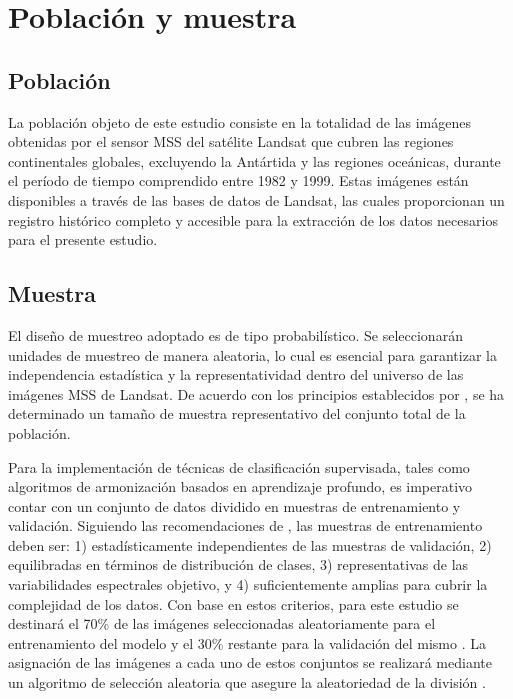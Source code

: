     \section{Población y muestra}
    
        \subsection{Población}
            La población objeto de este estudio consiste en la totalidad de las imágenes obtenidas por el sensor MSS del satélite Landsat que cubren las regiones continentales globales, excluyendo la Antártida y las regiones oceánicas, durante el período de tiempo comprendido entre 1982 y 1999. Estas imágenes están disponibles a través de las bases de datos de Landsat, las cuales proporcionan un registro histórico completo y accesible para la extracción de los datos necesarios para el presente estudio.

        \subsection{Muestra}
            El diseño de muestreo adoptado es de tipo probabilístico. Se seleccionarán unidades de muestreo de manera aleatoria, lo cual es esencial para garantizar la independencia estadística y la representatividad dentro del universo de las imágenes MSS de Landsat. De acuerdo con los principios establecidos por \textcite{hernandez2014recoleccion}, se ha determinado un tamaño de muestra representativo del conjunto total de la población.

            Para la implementación de técnicas de clasificación supervisada, tales como algoritmos de armonización basados en aprendizaje profundo, es imperativo contar con un conjunto de datos dividido en muestras de entrenamiento y validación. Siguiendo las recomendaciones de \textcite{belgiu2016random}, las muestras de entrenamiento deben ser: 1) estadísticamente independientes de las muestras de validación, 2) equilibradas en términos de distribución de clases, 3) representativas de las variabilidades espectrales objetivo, y 4) suficientemente amplias para cubrir la complejidad de los datos. Con base en estos criterios, para este estudio se destinará el 70\% de las imágenes seleccionadas aleatoriamente para el entrenamiento del modelo y el 30\% restante para la validación del mismo \autocite{nami2018spatial}. La asignación de las imágenes a cada uno de estos conjuntos se realizará mediante un algoritmo de selección aleatoria que asegure la aleatoriedad de la división \autocite{gigovic2019testing}.
        
